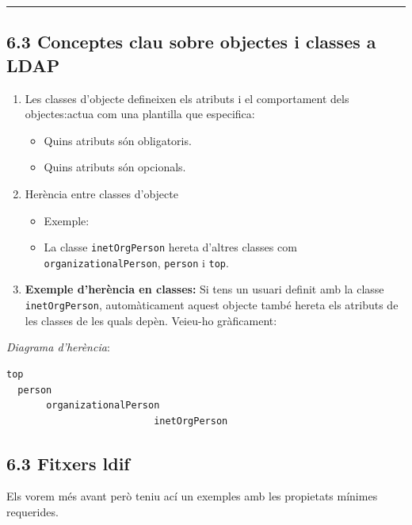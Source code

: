 \documentclass[
  12 pt,
  a4paper,
]{article}
\providecommand{\tightlist}{%
  \setlength{\itemsep}{0pt}\setlength{\parskip}{0pt}}
\begin{document}
\begin{center}\rule{0.5\linewidth}{0.5pt}\end{center}

\subsection{6.3 Conceptes clau sobre objectes i classes a
LDAP}\label{conceptes-clau-sobre-objectes-i-classes-a-ldap}

\begin{enumerate}
\def\labelenumi{\arabic{enumi}.}
\tightlist
\item
  Les classes d'objecte defineixen els atributs i el comportament dels
  objectes:actua com una plantilla que especifica:

  \begin{itemize}
  \tightlist
  \item
    Quins atributs són obligatoris.
  \item
    Quins atributs són opcionals.
  \end{itemize}
\item
  Herència entre classes d'objecte

  \begin{itemize}
  \tightlist
  \item
    Exemple:
  \item
    La classe \texttt{inetOrgPerson} hereta d'altres classes com
    \texttt{organizationalPerson}, \texttt{person} i \texttt{top}.
  \end{itemize}
\item
  \textbf{Exemple d'herència en classes:} Si tens un usuari definit amb
  la classe \texttt{inetOrgPerson}, automàticament aquest objecte també
  hereta els atributs de les classes de les quals depèn. Veieu-ho
  gràficament:
\end{enumerate}

\emph{Diagrama d'herència}:

\begin{verbatim}
top
  person
       organizationalPerson
                          inetOrgPerson
\end{verbatim}

\subsection{6.3 Fitxers ldif}\label{fitxers-ldif}

Els vorem més avant però teniu ací un exemples amb les propietats
mínimes requerides.
\end{document}
